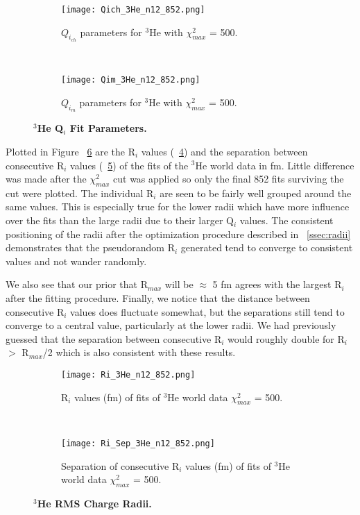 \begin{figure}[!ht]
\begin{subfigure}{1.\textwidth}
  \centering
  \texttt{[image: Qich\_3He\_n12\_852.png]}
  \caption{$Q_{i_{ch}}$ parameters for $^3$He with $\chi^2_{max}$ = 500.}
  \label{fig:3he_qch}
\end{subfigure}\\
\begin{subfigure}{1.\textwidth}
  \centering
  \texttt{[image: Qim\_3He\_n12\_852.png]}
  \caption{$Q_{i_{m}}$ parameters for $^3$He with $\chi^2_{max}$ = 500.}
  \label{fig:3he_qm}
\end{subfigure}
\caption{\bf{$^3$He Q$_i$ Fit Parameters.}}
\label{fig:3he_qi}
\end{figure}

Plotted in Figure ~\ref{fig:3he_ri} are the R$_i$ values (~\ref{fig:3he_ri_ind}) and the separation between consecutive R$_i$ values (~\ref{fig:3he_ri_sep}) of the fits of the $^3$He world data in fm. Little difference was made after the $\chi^2_{max}$ cut was applied so only the final 852 fits surviving the cut were plotted. The individual R$_i$ are seen to be fairly well grouped around the same values. This is especially true for the lower radii which have more influence over the fits than the large radii due to their larger Q$_i$ values. The consistent positioning of the radii after the optimization procedure described in ~\ref{ssec:radii} demonstrates that the pseudorandom R$_i$ generated tend to converge to consistent values and not wander randomly. 

We also see that our prior that R$_{max}$ will be $\approx$ 5 fm agrees with the largest R$_i$ after the fitting procedure. Finally, we notice that the distance between consecutive R$_i$ values does fluctuate somewhat, but the separations still tend to converge to a central value, particularly at the lower radii. We had previously guessed that the separation between consecutive R$_i$ would roughly double for R$_i$ $>$ R$_{max}$/2 which is also consistent with these results.

\begin{figure}[!ht]
\begin{subfigure}{1.\textwidth}
  \centering
  \texttt{[image: Ri\_3He\_n12\_852.png]}
  \caption{R$_i$ values (fm) of fits of $^3$He world data $\chi^2_{max}$ = 500.}
  \label{fig:3he_ri_ind}
\end{subfigure}\\
\begin{subfigure}{1.\textwidth}
  \centering
  \texttt{[image: Ri\_Sep\_3He\_n12\_852.png]}
  \caption{Separation of consecutive R$_i$ values (fm) of fits of $^3$He world data $\chi^2_{max}$ = 500.}
  \label{fig:3he_ri_sep}
\end{subfigure}
\caption{\bf{$^3$He RMS Charge Radii.}}
\label{fig:3he_ri}
\end{figure}

